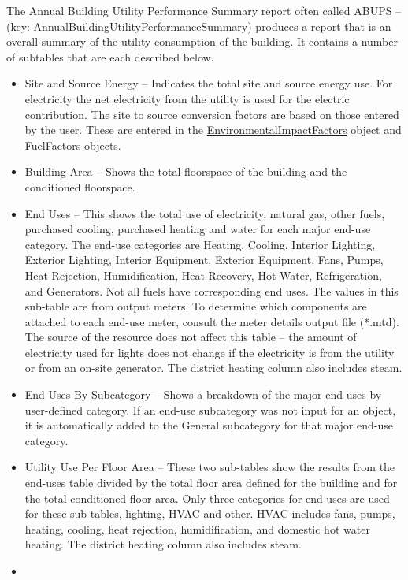 The Annual Building Utility Performance Summary report often called ABUPS -- (key: AnnualBuildingUtilityPerformanceSummary) produces a report that is an overall summary of the utility consumption of the building. It contains a number of subtables that are each described below.

\begin{itemize}
\item
  Site and Source Energy -- Indicates the total site and source energy use. For electricity the net electricity from the utility is used for the electric contribution. The site to source conversion factors are based on those entered by the user. These are entered in the \hyperref[environmentalimpactfactors]{EnvironmentalImpactFactors} object and \hyperref[fuelfactors]{FuelFactors} objects.
\item
  Building Area -- Shows the total floorspace of the building and the conditioned floorspace.
\item
  End Uses -- This shows the total use of electricity, natural gas, other fuels, purchased cooling, purchased heating and water for each major end-use category. The end-use categories are Heating, Cooling, Interior Lighting, Exterior Lighting, Interior Equipment, Exterior Equipment, Fans, Pumps, Heat Rejection, Humidification, Heat Recovery, Hot Water, Refrigeration, and Generators. Not all fuels have corresponding end uses. The values in this sub-table are from output meters. To determine which components are attached to each end-use meter, consult the meter details output file (*.mtd). The source of the resource does not affect this table -- the amount of electricity used for lights does not change if the electricity is from the utility or from an on-site generator. The district heating column also includes steam.
\item
  End Uses By Subcategory -- Shows a breakdown of the major end uses by user-defined category. If an end-use subcategory was not input for an object, it is automatically added to the General subcategory for that major end-use category.
\item
  Utility Use Per Floor Area -- These two sub-tables show the results from the end-uses table divided by the total floor area defined for the building and for the total conditioned floor area. Only three categories for end-uses are used for these sub-tables, lighting, HVAC and other. HVAC includes fans, pumps, heating, cooling, heat rejection, humidification, and domestic hot water heating. The district heating column also includes steam.
\item

\end{itemize}
